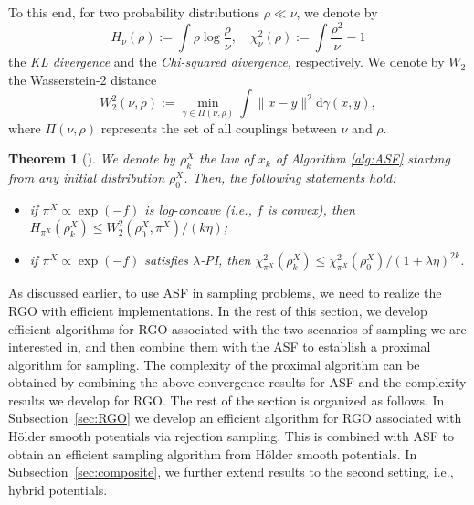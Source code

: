 \documentclass[11pt,letterpaper]{article}
\newcommand{\chen}{\color{cyan}}
\newtheorem{theorem}[thm]{Theorem}
\newcommand{\lam}{{\lambda}}
\begin{document}
To this end, for two probability distributions $\rho \ll \nu$, we denote by 
    \[
        H_\nu(\rho) := \int \rho \log\frac{\rho}{\nu},\quad \chi_\nu^2 (\rho):= \int \frac{\rho^2}{\nu}-1
    \]
the {\em KL divergence} and the {\em Chi-squared divergence}, respectively. 
We denote by $W_2$ the Wasserstein-2 distance
    \[
        W_2^2(\nu,\rho) := \min_{\gamma\in \Pi(\nu,\rho)}\int \|x-y\|^2 {\mathrm d}\gamma(x,y),
    \]
where $\Pi(\nu,\rho)$ represents the set of all couplings between $\nu$ and $\rho$.

\begin{theorem}[{\cite[Theorems 2 \& 4]{chen2022improved}}]\label{Thm:LC}
We denote by $\rho_k^X$ the law of $x_k$ of Algorithm \ref{alg:ASF} starting from any initial distribution $\rho_0^X$. Then, the following statements hold:
\begin{itemize}
    \item[a)] if $\pi^X \propto \exp(-f)$ is log-concave (\textit{i.e.}, $f$ is convex), then $H_{\pi^X}(\rho_k^X)
        \le W_2^2(\rho_0^X, \pi^X)/(k\eta)$;
    \item[b)] if $\pi^X \propto \exp(-f)$ satisfies $\lam$-PI, then $\chi_{\pi^X}^2(\rho^X_k) \le \chi_{\pi^X}^2(\rho^X_0)/{(1 + \lam \eta)}^{2k}$.
\end{itemize}
\end{theorem}





As discussed earlier, to use ASF in sampling problems, we need to realize the RGO with efficient implementations. In the rest of this section, we develop efficient algorithms for RGO associated with the two scenarios of sampling we are interested in, and then combine them with the ASF to establish a proximal algorithm for sampling. The complexity of the proximal algorithm can be obtained by combining the above convergence results for ASF and the complexity results we develop for RGO. The rest of the section is organized as follows. In Subsection~\ref{sec:RGO} we develop an efficient algorithm for RGO associated with Hölder smooth potentials via rejection sampling. This is combined with ASF to obtain an efficient sampling algorithm from Hölder smooth potentials. In Subsection~\ref{sec:composite}, we further extend results to the second setting, i.e., hybrid potentials. 
\end{document}
